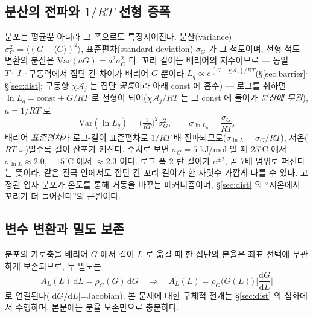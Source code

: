 \documentclass[11pt,a4paper]{article}
\newcommand{\dd}{\mathrm{d}}
\begin{document}
\subsection{분산의 전파와 $1/RT$ 선형 증폭}
분포는 평균뿐 아니라 그 폭으로도 특징지어진다. 분산(variance) $\sigma_G^2=\langle(G-\langle G\rangle)^2\rangle$,
표준편차(standard deviation) $\sigma_G$ 가 그 척도이며, 선형 척도 변환의 분산은 $\mathrm{Var}(aG)=a^2\sigma_G^2$ 다.
꼬리 길이는 배리어의 지수이므로 — 동일 $T\cdot|I|\cdot$구동력에서 집단 간 차이가 배리어 $G$ 뿐이라
$L_q\propto e^{(G-\chi\mathcal A_j)/RT}$(\S\ref{sec:barrier}$\cdot$\S\ref{sec:dist}; 구동항 $\chi\mathcal A_j$ 는 집단
\emph{공통}이라 아래 const 에 흡수) — 로그를 취하면 $\ln L_q=\text{const}+G/RT$ 로 선형이 되어($\chi\mathcal A_j/RT$
는 그 const 에 들어가 \emph{분산에 무관}), $a=1/RT$ 로
\begin{equation}
\mathrm{Var}(\ln L_q)=\Big(\tfrac{1}{RT}\Big)^2\sigma_G^2,\qquad \sigma_{\ln L_q}=\frac{\sigma_G}{RT}.
\label{eq:varprop}
\end{equation}
배리어 \emph{표준편차}가 로그-길이 표준편차로 $1/RT$ 배 전파되므로($\sigma_{\ln L}=\sigma_G/RT$),
저온($RT\downarrow$)일수록 길이 산포가 커진다. 수치로 보면 $\sigma_G=5$ kJ/mol 일 때 $25^\circ$C 에서
$\sigma_{\ln L}\approx2.0$, $-15^\circ$C 에서 $\approx2.3$ 이다. 로그 폭 $2$ 란 길이가 $e^{\pm2}$, 곧
$7$배 범위로 퍼진다는 뜻이라, 같은 전극 안에서도 집단 간 꼬리 길이가 한 자릿수 가깝게 다를 수 있다. 고정된
입자 분포가 온도를 통해 거동을 바꾸는 메커니즘이며, \S\ref{sec:dist} 의 ``저온에서 꼬리가 더 늘어진다''의 근원이다.

\subsection{변수 변환과 밀도 보존}
분포의 가로축을 배리어 $G$ 에서 길이 $L$ 로 옮길 때 한 집단의 분율은 좌표 선택에 무관하게 보존되므로, 두 밀도는
\begin{equation}
A_L(L)\,\dd L=\rho_G(G)\,\dd G\quad\Longrightarrow\quad A_L(L)=\rho_G\big(G(L)\big)\,\Big|\frac{\dd G}{\dd L}\Big|
\label{eq:jacobian}
\end{equation}
로 연결된다($|\dd G/\dd L|$=Jacobian). 본 문제에 대한 구체적 전개는 \S\ref{sec:dist} 의 심화에서 수행하며,
본문에는 분율 보존만으로 충분하다.
\end{document}
